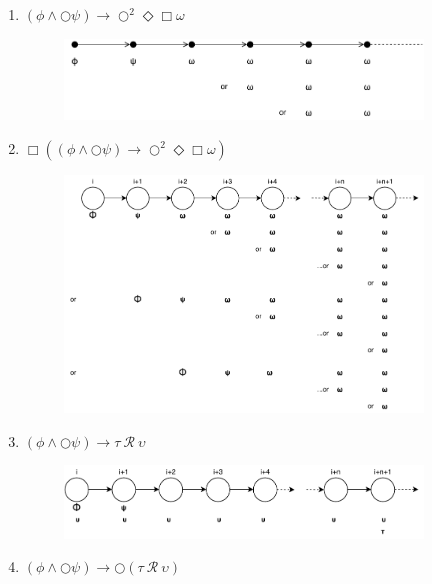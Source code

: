 \documentclass[12pt]{article}
\begin{document}
\begin{enumerate}
  \newpage

	\item $(\phi \wedge \bigcirc \psi) \rightarrow \bigcirc^{2} \Diamond \Box \omega$

  \begin{figure}[h!]
    \centering
    \includegraphics[width=0.9\textwidth]{figures/2_4.pdf}
   \end{figure}

	\item $\Box ((\phi \wedge \bigcirc \psi) \rightarrow \bigcirc^{2} \Diamond \Box \omega)$

  \begin{figure}[h!]
    \centering
    \includegraphics[width=0.9\textwidth]{figures/2_5.pdf}
   \end{figure}

	\item $(\phi \wedge \bigcirc \psi) \rightarrow \tau ~\mathcal{R}~ \upsilon$

  \begin{figure}[h!]
    \centering
    \includegraphics[width=0.9\textwidth]{figures/2_6.pdf}
   \end{figure}

	\item $(\phi \wedge \bigcirc \psi) \rightarrow \bigcirc (\tau ~\mathcal{R}~ \upsilon)$


\end{enumerate}
\end{document}
